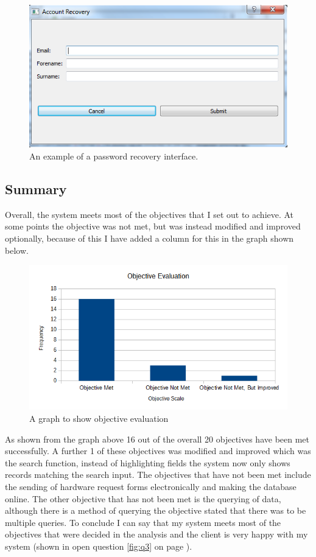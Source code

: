 \begin{figure}[H]
    \includegraphics[width=\textwidth]{./Testing/Images/ForgotPassword.png}
    \caption{An example of a password recovery interface.} 
\end{figure}


\subsection{Summary}

Overall, the system meets most of the objectives that I set out to achieve. At some points the objective was not met, but was instead modified and improved optionally, because of this I have added a column for this in the graph shown below.

\begin{figure}[H]
    \includegraphics[width=\textwidth]{./Evaluation/EvaluationQuestionnaire/graph2.png}
    \caption{A graph to show objective evaluation} \label{graph2}
\end{figure}

As shown from the graph above 16 out of the overall 20 objectives have been met successfully. A further 1 of these objectives was modified and improved which was the search function, instead of highlighting fields the system now only shows records matching the search input. The objectives that have not been met include the sending of hardware request forms electronically and making the database online. The other objective that has not been met is the querying of data, although there is a method of querying the objective stated that there was to be multiple queries. To conclude I can say that my system meets most of the objectives that were decided in the analysis and the client is very happy with my system (shown in open question \ref{fig:q3} on page \pageref{fig:q3}).

